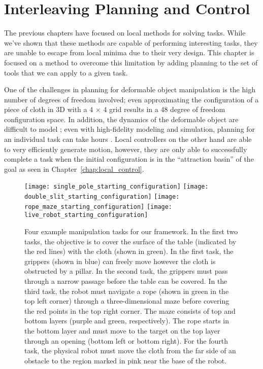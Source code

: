 \chapter{Interleaving Planning and Control}
\label{chap:interleaving}

The previous chapters have focused on local methods for solving tasks. While we've shown that these methods are capable of performing interesting tasks, they are unable to escape from local minima due to their very design. This chapter is focused on a method to overcome this limitation by adding planning to the set of tools that we can apply to a given task.

One of the challenges in planning for deformable object manipulation is the high number of degrees of freedom involved; even approximating the configuration of a piece of cloth in 3D with a 4 $\times$ 4 grid results in a 48 degree of freedom configuration space. In addition, the dynamics of the deformable object are difficult to model \citep{Essahbi2012}; even with high-fidelity modeling and simulation, planning for an individual task can take hours \citep{Bai2016}. Local controllers on the other hand are able to very efficiently generate motion, however, they are only able to successfully complete a task when the initial configuration is in the ``attraction basin'' of the goal as seen in Chapter~\ref{chap:local_control}.

\begin{figure*}[t]
    \centering
    \texttt{[image: single\_pole\_starting\_configuration]}\hfill
    \texttt{[image: double\_slit\_starting\_configuration]}\hfill
    \texttt{[image: rope\_maze\_starting\_configuration]}\hfill
    \texttt{[image: live\_robot\_starting\_configuration]}%
    \caption{Four example manipulation tasks for our framework. In the first two tasks, the objective is to cover the surface of the table (indicated by the red lines) with the cloth (shown in green). In the first task, the grippers (shown in blue) can freely move however the cloth is obstructed by a pillar. In the second task, the grippers must pass through a narrow passage before the table can be covered. In the third task, the robot must navigate a rope (shown in green in the top left corner) through a three-dimensional maze before covering the red points in the top right corner. The maze consists of top and bottom layers (purple and green, respectively). The rope starts in the bottom layer and must move to the target on the top layer through an opening (bottom left or bottom right). For the fourth task, the physical robot must move the cloth from the far side of an obstacle to the region marked in pink near the base of the robot.}
    \label{fig:example_tasks}
\end{figure*}


